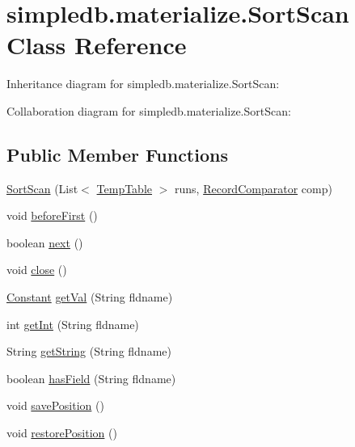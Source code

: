 \hypertarget{classsimpledb_1_1materialize_1_1SortScan}{}\section{simpledb.\+materialize.\+Sort\+Scan Class Reference}
\label{classsimpledb_1_1materialize_1_1SortScan}


Inheritance diagram for simpledb.\+materialize.\+Sort\+Scan\+:


Collaboration diagram for simpledb.\+materialize.\+Sort\+Scan\+:
\subsection*{Public Member Functions}
\begin{DoxyCompactItemize}
\item 
\hyperlink{classsimpledb_1_1materialize_1_1SortScan_aff8ec9b6958bc0af2b668e33e1a23f3d}{Sort\+Scan} (List$<$ \hyperlink{classsimpledb_1_1materialize_1_1TempTable}{Temp\+Table} $>$ runs, \hyperlink{classsimpledb_1_1materialize_1_1RecordComparator}{Record\+Comparator} comp)
\item 
void \hyperlink{classsimpledb_1_1materialize_1_1SortScan_aa9fed9077d78dcbd50a0c1504e5b5c86}{before\+First} ()
\item 
boolean \hyperlink{classsimpledb_1_1materialize_1_1SortScan_a4180abc890522265c22728e67f2131cd}{next} ()
\item 
void \hyperlink{classsimpledb_1_1materialize_1_1SortScan_abbd920a65ae5509e705112fe6cfbb966}{close} ()
\item 
\hyperlink{classsimpledb_1_1query_1_1Constant}{Constant} \hyperlink{classsimpledb_1_1materialize_1_1SortScan_a6be5b206585dbd12c251a203364b5b1f}{get\+Val} (String fldname)
\item 
int \hyperlink{classsimpledb_1_1materialize_1_1SortScan_a2a0cdce171742d1f7b29d15ba4413621}{get\+Int} (String fldname)
\item 
String \hyperlink{classsimpledb_1_1materialize_1_1SortScan_a4e8f52b556a029c86480d969f06bb1e0}{get\+String} (String fldname)
\item 
boolean \hyperlink{classsimpledb_1_1materialize_1_1SortScan_a9987dac3483863a86dd3a97495a1f522}{has\+Field} (String fldname)
\item 
void \hyperlink{classsimpledb_1_1materialize_1_1SortScan_a58bd86766d38fce4c85b214a13cd4f5d}{save\+Position} ()
\item 
void \hyperlink{classsimpledb_1_1materialize_1_1SortScan_a11a8c64ec0c360d31469606780481625}{restore\+Position} ()
\end{DoxyCompactItemize}


